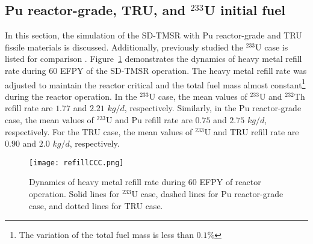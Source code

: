 \subsection{Pu reactor-grade, TRU, and $^{233}$U initial fuel}
In this section, the simulation of the SD-TMSR with Pu reactor-grade and TRU 
fissile materials is discussed. Additionally, previously studied the $^{233}$U 
case is listed for comparison \cite{ashraf2019whole_core}. 
Figure~\ref{fig:refillCCC} demonstrates the dynamics of heavy metal refill 
rate during 60 \gls{EFPY} of the SD-TMSR operation. The heavy metal refill 
rate was adjusted to maintain the reactor critical and the total fuel mass 
almost constant\footnote{The variation of the total fuel mass is less than 
$0.1\%$} during the reactor operation. In the $^{233}$U case, the mean values of 
$^{233}$U and $^{232}$Th refill rate are $1.77$ and $2.21$ $kg/d$, 
respectively. Similarly, in the Pu reactor-grade case, the mean values of 
$^{233}$U and Pu refill rate are $0.75$ and $2.75$ $kg/d$, respectively. For  
the TRU case, the mean values of $^{233}$U and TRU refill rate are $0.90$ and 
$2.0$ $kg/d$, respectively.
\begin{figure}
	\centering
	\texttt{[image: refillCCC.png]}
			\vspace{-0.5in}
	\caption{Dynamics of heavy metal refill rate during 60 \gls{EFPY} of 
		reactor operation. Solid lines for $^{233}$U case, dashed lines for Pu 
		reactor-grade case, and dotted lines for TRU case.}
	\label{fig:refillCCC}
\end{figure}

